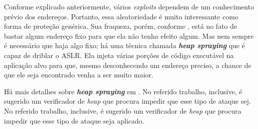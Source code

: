 			
			Conforme explicado anteriormente, vários \textsl{exploits} dependem de um conhecimento
			prévio dos endereços. Portanto, essa aleatoriedade é muito interessante como
			forma de proteção genérica. Sua fraqueza, porém, conforme \cite{Anley2007}, está no fato
			de bastar algum endereço fixo para que ela não tenha efeito algum. Mas nem sempre é necessário
			que haja algo fixo; há uma técnica chamada \textsl{\textbf{heap spraying}} que é capaz
			de driblar o ASLR. Ela injeta várias porções de código executável na aplicação alvo
			para que, mesmo desconhecendo um endereço preciso, a chance de que ele seja encontrado
			venha a ser muito maior.

			
			Há mais detalhes sobre \textsl{\textbf{heap spraying}} em \cite{Nozzle}. No referido trabalho,
			inclusive, é sugerido um verificador de \textsl{heap} que procura impedir que esse tipo
			de ataque sej. No referido trabalho,
			inclusive, é sugerido um verificador de \textsl{heap} que procura impedir que esse tipo
			de ataque seja aplicado.
			
			
			

		

		
			
	
